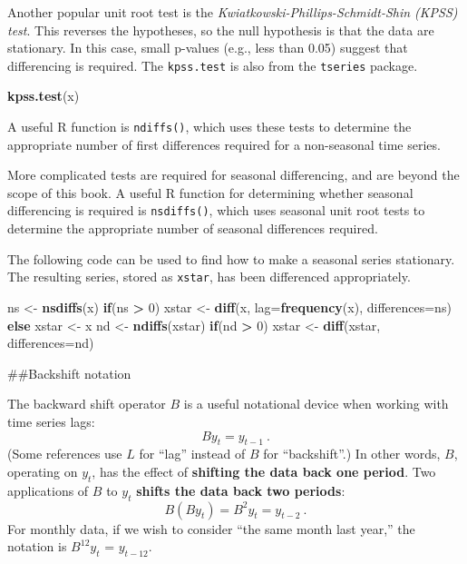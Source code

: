 \documentclass[]{book}
\newenvironment{Shaded}{\begin{snugshade}}{\end{snugshade}}
\newcommand{\ControlFlowTok}[1]{\textcolor[rgb]{0.13,0.29,0.53}{\textbf{#1}}}
\newcommand{\DataTypeTok}[1]{\textcolor[rgb]{0.13,0.29,0.53}{#1}}
\newcommand{\DecValTok}[1]{\textcolor[rgb]{0.00,0.00,0.81}{#1}}
\newcommand{\KeywordTok}[1]{\textcolor[rgb]{0.13,0.29,0.53}{\textbf{#1}}}
\newcommand{\NormalTok}[1]{#1}
\newcommand{\OperatorTok}[1]{\textcolor[rgb]{0.81,0.36,0.00}{\textbf{#1}}}
\newcommand{\StringTok}[1]{\textcolor[rgb]{0.31,0.60,0.02}{#1}}
\begin{document}
Another popular unit root test is the \emph{Kwiatkowski-Phillips-Schmidt-Shin (KPSS) test}. This reverses the hypotheses, so the null hypothesis is that the data are stationary. In this case, small p-values (e.g., less than 0.05) suggest that differencing is required. The \texttt{kpss.test} is also from the \texttt{tseries} package.

\begin{Shaded}
\begin{Highlighting}[]
\KeywordTok{kpss.test}\NormalTok{(x)}
\end{Highlighting}
\end{Shaded}

A useful R function is \texttt{ndiffs()}, which uses these tests to determine the appropriate number of first differences required for a non-seasonal time series.

More complicated tests are required for seasonal differencing, and are beyond the scope of this book. A useful R function for determining whether seasonal differencing is required is \texttt{nsdiffs()}, which uses seasonal unit root tests to determine the appropriate number of seasonal differences required.

The following code can be used to find how to make a seasonal series stationary. The resulting series, stored as \texttt{xstar}, has been differenced appropriately.

\begin{Shaded}
\begin{Highlighting}[]
\NormalTok{ns <-}\StringTok{ }\KeywordTok{nsdiffs}\NormalTok{(x)}
\ControlFlowTok{if}\NormalTok{(ns }\OperatorTok{>}\StringTok{ }\DecValTok{0}\NormalTok{)}
\NormalTok{  xstar <-}\StringTok{ }\KeywordTok{diff}\NormalTok{(x, }\DataTypeTok{lag=}\KeywordTok{frequency}\NormalTok{(x), }\DataTypeTok{differences=}\NormalTok{ns)}
\ControlFlowTok{else}
\NormalTok{  xstar <-}\StringTok{ }\NormalTok{x}
\NormalTok{nd <-}\StringTok{ }\KeywordTok{ndiffs}\NormalTok{(xstar)}
\ControlFlowTok{if}\NormalTok{(nd }\OperatorTok{>}\StringTok{ }\DecValTok{0}\NormalTok{)}
\NormalTok{  xstar <-}\StringTok{ }\KeywordTok{diff}\NormalTok{(xstar, }\DataTypeTok{differences=}\NormalTok{nd)}
\end{Highlighting}
\end{Shaded}

\#\#Backshift notation

The backward shift operator \(B\) is a useful notational device when working with time series lags:
\[
  B y_{t} = y_{t - 1} \: .
\]
(Some references use \(L\) for ``lag'' instead of \(B\) for ``backshift''.) In other words, \(B\), operating on \(y_{t}\), has the effect of \textbf{shifting the data back one period}. Two applications of \(B\) to \(y_{t}\) \textbf{shifts the data back two periods}:
\[
  B(By_{t}) = B^{2}y_{t} = y_{t-2}\: .
\]
For monthly data, if we wish to consider ``the same month last year,'' the notation is \(B^{12}y_{t}\) = \(y_{t-12}\).
\end{document}
